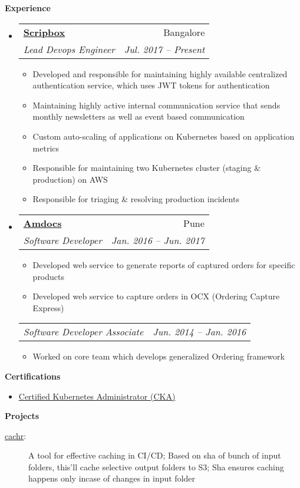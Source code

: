 \documentclass[letterpaper,11pt]{article}
\makeatletter
\newcommand{\resitem}[1]{\item #1 \vspace{-2pt}}
\newcommand{\resheading}[1]{{\large \colorbox{mygrey}{\begin{minipage}{\textwidth}{\textbf{#1 \vphantom{p\^{E}}}}\end{minipage}}}}
\newcommand{\ressubheading}[4]{
\begin{tabular*}{6.5in}{l@{\extracolsep{\fill}}r}
		\textbf{#1} & #2 \\
		\textit{#3} & \textit{#4} \\
\end{tabular*}\vspace{-6pt}}
\newcommand{\ressubsubheading}[2]{
\begin{tabular*}{6.5in}{l@{\extracolsep{\fill}}r}
		\textit{#1} & \textit{#2} \\
\end{tabular*}\vspace{-6pt}}
\makeatother
\begin{document}
\resheading{Experience}
	\begin{itemize}
		\item 
			\ressubheading{\href{https://scripbox.com/}{Scripbox}}{Bangalore}
				{Lead Devops Engineer}{Jul. 2017 -- Present}
				{ \footnotesize
				\begin{itemize}
					\resitem{Developed and responsible for maintaining highly available centralized authentication service, which uses JWT tokens for authentication}
					\resitem{Maintaining highly active internal communication service that sends monthly newsletters as well as event based communication}
					\resitem{Custom auto-scaling of applications on Kubernetes based on application metrics}
					\resitem{Responsible for maintaining two Kubernetes cluster (staging \& production) on AWS}
					\resitem{Responsible for triaging \& resolving production incidents}
				\end{itemize}
				}
\begin{comment}
      \ressubsubheading{Product Engineer}{Aug. 2019 -- Present}
        { \footnotesize
        \begin{itemize}
          \resitem{Maintiaining Sanchaar}
          \resitem{blah}
          \resitem{blah}
        \end{itemize}
        }
\end{comment}


		\item 
			\ressubheading{\href{https://www.amdocs.com/}{Amdocs}}{Pune}{Software Developer}{Jan. 2016 -- Jun. 2017}
				{ \footnotesize
				\begin{itemize}
					\resitem{Developed web service to generate reports of captured orders for specific products}
					\resitem{Developed web service to capture orders in OCX (Ordering Capture Express)}
				\end{itemize}
				}
      \ressubsubheading{Software Developer Associate}{Jun. 2014 -- Jan. 2016}
        { \footnotesize
        \begin{itemize}
          \resitem{Worked on core team which develops generalized Ordering framework}
        \end{itemize}
        }
	\end{itemize}  %


\resheading{Certifications}
  \begin{itemize}
      \resitem{\footnotesize \href{https://ti-user-certificates.s3.amazonaws.com/e0df7fbf-a057-42af-8a1f-590912be5460/51db2b03-30f4-54b3-9cbb-456782c62bd8-mohit-s-choudhary-certified-kubernetes-administrator-cka-certificate.pdf}{Certified Kubernetes Administrator (CKA)}}
  \end{itemize}

\resheading{Projects}

\begin{description}
  \item[{\href{https://github.com/ms-choudhary/cachr}{cachr}}:] { \footnotesize A tool for effective caching in CI/CD; Based on sha of bunch of input folders, this'll cache selective output folders to S3; Sha ensures caching happens only incase of changes in input folder }
\end{description}
\end{document}
